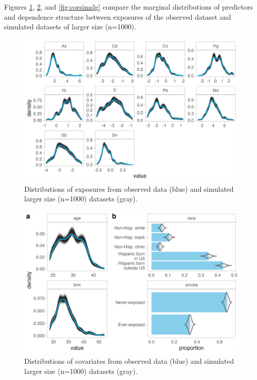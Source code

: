 \documentclass[12pt, twoside]{amherstthesis}
\begin{document}
Figures \ref{fig:univexplg}, \ref{fig:univcovlg}, and \ref{fig:corsimslg} compare the marginal distributions of predictors and dependence structure between exposures of the observed dataset and simulated datasets of larger size (n=1000).
\begin{figure}

{\centering \includegraphics[width=0.75\linewidth]{figures/ch4_univ_exp_sim_lg} 

}

\caption{Distributions of exposures from observed data (blue) and simulated larger size (n=1000) datasets (gray).}\label{fig:univexplg}
\end{figure}
\begin{figure}

{\centering \includegraphics[width=0.75\linewidth]{figures/ch4_univ_cov_sim_lg} 

}

\caption{Distributions of covariates from observed data (blue) and simulated larger size (n=1000) datasets (gray).}\label{fig:univcovlg}
\end{figure}
\end{document}
